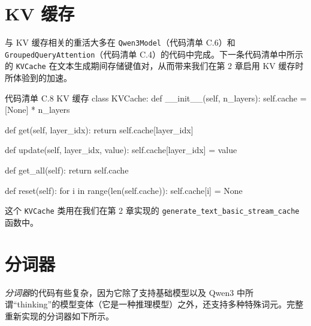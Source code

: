\section{KV 缓存}

与 KV 缓存相关的重活大多在 \texttt{Qwen3Model}（代码清单 C.6）和 \texttt{GroupedQueryAttention}（代码清单 C.4）的代码中完成。下一条代码清单中所示的 \texttt{KVCache} 在文本生成期间存储键值对，从而带来我们在第 2 章启用 KV 缓存时所体验到的加速。

\begin{codeboxt}{代码清单 C.8 KV 缓存}
class KVCache:
    def __init__(self, n_layers):
        self.cache = [None] * n_layers

    def get(self, layer_idx):
        return self.cache[layer_idx]

    def update(self, layer_idx, value):
        self.cache[layer_idx] = value

    def get_all(self):
        return self.cache

    def reset(self):
        for i in range(len(self.cache)):
            self.cache[i] = None
\end{codeboxt}

这个 \texttt{KVCache} 类用在我们在第 2 章实现的 \texttt{generate\_text\_basic\_stream\_cache} 函数中。

\section{分词器}

\emph{分词器}的代码有些复杂，因为它除了支持基础模型以及 Qwen3 中所谓“thinking”的模型变体（它是一种推理模型）之外，还支持多种特殊词元。完整重新实现的分词器如下所示。


